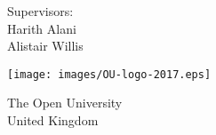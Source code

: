 \begin{titlepage}
    \begin{center}
        \vspace*{1cm}
            
        \Huge
        \textbf{\thetitle}
            
        \vspace{1cm}
        \LARGE
        \makeatletter \@subtitle \makeatother %
            
        \vspace{1.5cm}
            
        \textbf{\theauthor}
            
        \vfill
            
        Supervisors:\\
        Harith Alani\\
        Alistair Willis
            
        \vspace{0.8cm}
            
        \texttt{[image: images/OU-logo-2017.eps]}
        \vspace{1.6cm}
        
        \centering
        \usebox{\largestimage}
        \hfill
        
        \vspace{0.8cm}
            
        \Large
        The Open University\\
        United Kingdom\\
        \thedate
            
    \end{center}
\end{titlepage}